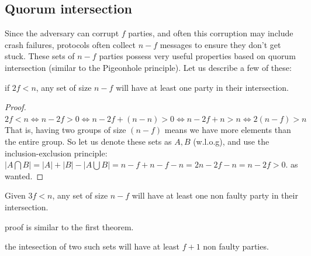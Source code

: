 \subsection{Quorum intersection}
Since the adversary can corrupt $f$ parties, and often this corruption may include crash failures,
 protocols often collect $n-f$ messages to ensure they don't get stuck.
  These sets of $n-f$ parties possess very useful properties based on quorum intersection
   (similar to the Pigeonhole principle).
   Let us describe a few of these:

\begin{thm}
    if $2f<n$, any set of size $n-f$  will have at least one party in their
    intersection.
\end{thm} 
 \begin{proof}
    $2f<n \iff n-2f>0 \iff n-2f +(n-n) >0 \iff n-2f+n>n \iff 2(n-f)>n$
    That is, having two groups of size $(n-f)$ means we have more elements than the entire group.
    So let us denote these sets as $A,B$ (w.l.o.g), and use the 
    inclusion-exclusion principle:
    $|A\bigcap B| = |A| + |B| - |A\bigcup B| = n-f + n-f - n = 2n - 2f - n = n - 2f > 0$.
    as wanted.
 \end{proof}

\begin{thm}
    Given $3f<n$, any set of size $n-f$ will have at least one non faulty party in their intersection.
\end{thm}
proof is similar to the first theorem.

\begin{corollary}
    the intesection of two such sets will have at least $f+1$ non faulty parties.
\end{corollary}

    
